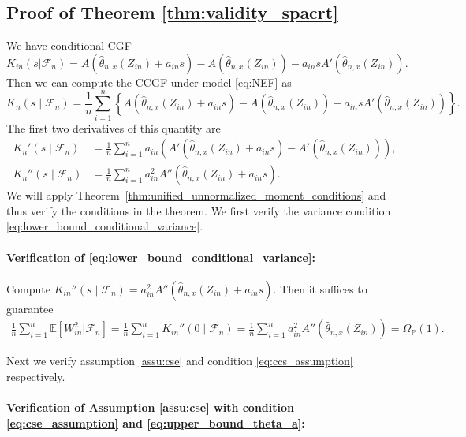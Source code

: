 \documentclass[12pt]{article}
\theoremstyle{definition}
\def\P{\mathbb{P}}
\def\P{\mathbb{P}}
\newcommand{\E}{\mathbb E}								%
\renewcommand{\P}{\mathbb{P}}							%
\newcommand{\srz}{Z}									%
\begin{document}
\subsection{Proof of Theorem \ref{thm:validity_spacrt}}

We have conditional CGF 
\begin{equation}
K_{in}(s|\mathcal{F}_n) = A(\widehat \theta_{n,x}(\srz_{in})+a_{in}s)-A(\widehat \theta_{n,x}(\srz_{in}))-a_{in}sA'(\widehat \theta_{n,x}(\srz_{in})).
\end{equation}
Then we can compute the CCGF under model \eqref{eq:NEF} as
\begin{equation}
K_n(s \mid \mathcal F_n) = \frac{1}{n}\sum_{i = 1}^n \left\{A(\widehat \theta_{n,x}(\srz_{in})+a_{in}s)-A(\widehat \theta_{n,x}(\srz_{in}))-a_{in}sA'(\widehat \theta_{n,x}(\srz_{in}))\right\}.
\end{equation}
The first two derivatives of this quantity are
\begin{align}
  K_n'(s \mid \mathcal F_n) &= \frac{1}{n}\sum_{i = 1}^n a_{in}\left(A'(\widehat \theta_{n,x}(\srz_{in})+a_{in}s)-A'(\widehat \theta_{n,x}(\srz_{in}))\right), \label{eq:conditional-cgf-derivative} \\
  K_n''(s \mid \mathcal F_n) &= \frac{1}{n}\sum_{i = 1}^n a_{in}^2A''(\widehat \theta_{n,x}(\srz_{in})+a_{in}s). \label{eq:conditional-cgf-second-derivative}
\end{align}
We will apply Theorem~\ref{thm:unified_unnormalized_moment_conditions} and thus verify the conditions in the theorem. We first verify the variance condition \eqref{eq:lower_bound_conditional_variance}.

\paragraph{\textbf{Verification of \eqref{eq:lower_bound_conditional_variance}}:}
Compute $K_{in}''(s\mid \mathcal{F}_n)= a_{in}^2A''(\widehat \theta_{n,x}(\srz_{in})+a_{in}s)$. Then it suffices to guarantee 
\begin{align*}
  \frac{1}{n}\sum_{i=1}^n \E[W_{in}^2|\mathcal{F}_n]=\frac{1}{n}\sum_{i=1}^n K_{in}''(0\mid \mathcal{F}_n)=\frac{1}{n}\sum_{i=1}^n a_{in}^2A''(\widehat \theta_{n,x}(\srz_{in}))=\Omega_\P(1).
\end{align*}

\noindent Next we verify assumption \ref{assu:cse} and condition \eqref{eq:ccs_assumption} respectively.

\paragraph{Verification of Assumption \ref{assu:cse} with condition \eqref{eq:cse_assumption} and \eqref{eq:upper_bound_theta_a}:} 
\end{document}
